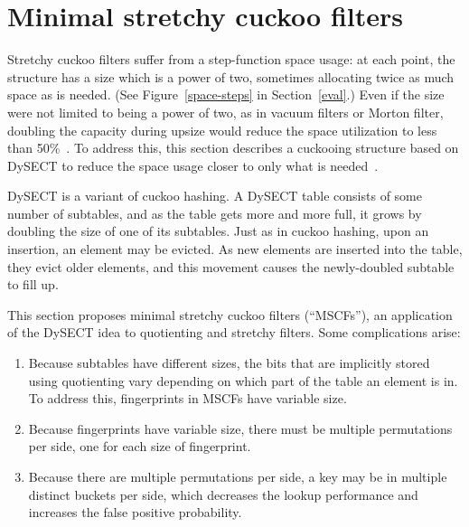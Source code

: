 \documentclass[letterpaper,twocolumn,10pt]{article}
\newcommand{\taffy}{stretchy}
\newcommand{\Taffy}{Stretchy}
\newcommand{\MTCF}{MSCF}
\newcommand{\taffy}{taffy}
\newcommand{\Taffy}{Taffy}
\newcommand{\MTCF}{MTCF}
\begin{document}


\section{Minimal \taffy{} cuckoo filters}
\label{mtcf}

\Taffy{} cuckoo filters suffer from a step-function space usage:
at each point, the structure has a size which is a power of two, sometimes allocating twice as much space as is needed. (See Figure~\ref{space-steps} in Section~\ref{eval}.)
Even if the size were not limited to being a power of two, as in vacuum filters or Morton filter, doubling the capacity during upsize would reduce the space utilization to less than 50\%~\cite{vacuum, morton-journal}.
To address this, this section describes a cuckooing structure based on DySECT to reduce the space usage closer to only what is needed~\cite{dysect}.

DySECT is a variant of cuckoo hashing.
A DySECT table consists of some number of subtables, and as the table gets more and more full, it grows by doubling the size of one of its subtables.
Just as in cuckoo hashing, upon an insertion, an element may be evicted.
As new elements are inserted into the table, they evict older elements, and this movement causes the newly-doubled subtable to fill up.

This section proposes minimal \taffy{} cuckoo filters (``\MTCF{}s''), an application of the DySECT idea to quotienting and \taffy{} filters.
Some complications arise:

\begin{enumerate}
  \item Because subtables have different sizes, the bits that are implicitly stored using quotienting vary depending on which part of the table an element is in.
    To address this, fingerprints in \MTCF{}s have variable size.
  \item Because fingerprints have variable size, there must be multiple permutations per side, one for each size of fingerprint.
  \item Because there are multiple permutations per side, a key may be in multiple distinct buckets per side, which decreases the lookup performance and increases the false positive probability.
\end{enumerate}
\end{document}
